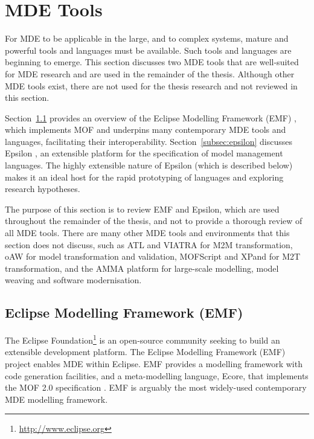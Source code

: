 
\section{MDE Tools}
\label{sec:mde_tools}
For MDE to be applicable in the large, and to complex systems, mature and powerful tools and languages must be available. Such tools and languages are beginning to emerge. This section discusses two MDE tools that are well-suited for MDE research and are used in the remainder of the thesis. Although other MDE tools exist, there are not used for the thesis research and not reviewed in this section.

Section~\ref{subsec:emf} provides an overview of the Eclipse Modelling Framework (EMF) \cite{steinberg09emf}, which implements MOF and underpins many contemporary MDE tools and languages, facilitating their interoperability. Section~\ref{subsec:epsilon} discusses Epsilon \cite{kolovos09thesis}, an extensible platform for the specification of model management languages. The highly extensible nature of Epsilon (which is described below) makes it an ideal host for the rapid prototyping of languages and exploring research hypotheses.  

The purpose of this section is to review EMF and Epsilon, which are used throughout the remainder of the thesis, and not to provide a thorough review of all MDE tools. There are many other MDE tools and environments that this section does not discuss, such as ATL \cite{atl} and VIATRA \cite{VIATRA} for M2M transformation, oAW \cite{oaw} for model transformation and validation, MOFScript \cite{oldevik05toward} and XPand \cite{xpand} for M2T transformation, and the AMMA \cite{amma} platform for large-scale modelling, model weaving and software modernisation.

\subsection{Eclipse Modelling Framework (EMF)}
\label{subsec:emf}
The Eclipse Foundation\footnote{\url{http://www.eclipse.org}} is an open-source community seeking to build an extensible development platform. The Eclipse Modelling Framework (EMF) project \cite{steinberg09emf} enables MDE within Eclipse. EMF provides a modelling framework with code generation facilities, and a meta-modelling language, Ecore, that implements the MOF 2.0 specification \cite{mof}. EMF is arguably the most widely-used contemporary MDE modelling framework.

